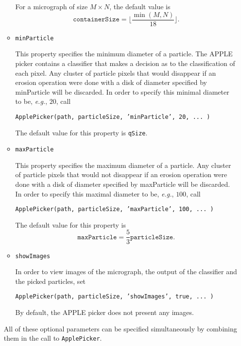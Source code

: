 \documentclass[12pt,a4paper]{article}
\newcommand{\floor}[1]{\lfloor #1 \rfloor}
\begin{document}
\begin{itemize}[leftmargin=0.5cm]
\begin{itemize}[leftmargin=0.5cm]
For a micrograph of size $M \times N$, the default value is $$ \texttt{containerSize}=\floor{\frac{\min\left(M, N\right)}{18}}.$$

\item \texttt{minParticle}

This property specifies the minimum diameter of a particle. The APPLE picker contains a classifier that makes a decision as to the classification of each pixel.
Any cluster of particle pixels that would disappear if an erosion operation were done with a disk of diameter specified by minParticle
will be discarded. In order to specify this minimal diameter to be, \textit{e.g.}, $20$, call
\begin{center}
\texttt{ApplePicker(path, particleSize, 'minParticle', 20, ... )}
\end{center}

The default value for this property is \texttt{qSize}.

\item \texttt{maxParticle}

This property specifies the maximum diameter of a particle.
Any cluster of particle pixels that would not disappear if an erosion operation were done with a disk of diameter specified by maxParticle
will be discarded. In order to specify this maximal diameter to be, \textit{e.g.}, $100$, call

\begin{center}
\texttt{ApplePicker(path, particleSize, 'maxParticle', 100, ... )}
\end{center}

The default value for this property is $$ \texttt{maxParticle}=\frac{5}{3}\texttt{particleSize}.$$

\item \texttt{showImages}

In order to view images of the micrograph, the output of the classifier and the picked particles, set
\begin{center}
\texttt{ApplePicker(path, particleSize, 'showImages', true, ... )}
\end{center}
By default, the APPLE picker does not present any images.

\end{itemize}

All of these optional parameters can be specified simultaneously by combining them in the call to \texttt{ApplePicker}.

\end{itemize}
\end{document}
